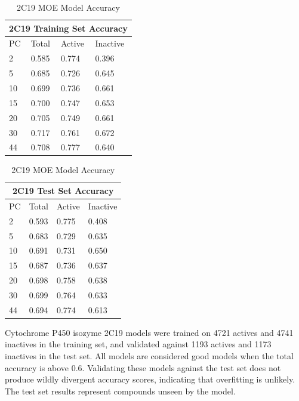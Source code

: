 \begin{table}[!htbp]
\begin{minipage}{.5\linewidth}
\centering
\begin{tabular}{|l|l|l|l|}
\hline
\multicolumn{4}{|c|}{2C19 Training Set Accuracy} \\ \hline
PC & Total          & Active          & Inactive \\ \hline
2  & 0.585          & 0.774           & 0.396   \\ \hline
5  & 0.685          & 0.726           & 0.645   \\ \hline
10 & 0.699          & 0.736           & 0.661    \\ \hline
15 & 0.700          & 0.747           & 0.653    \\ \hline
20 & 0.705          & 0.749           & 0.661    \\ \hline
30 & 0.717          & 0.761           & 0.672    \\ \hline
44 & 0.708          & 0.777           & 0.640    \\ \hline
\end{tabular}
\end{minipage}%
\begin{minipage}{.5\linewidth}
\centering
\begin{tabular}{|l|l|l|l|}
\hline
\multicolumn{4}{|c|}{2C19 Test Set Accuracy}       \\ \hline
PC & Total          & Active          & Inactive   \\ \hline
2  & 0.593          & 0.775           & 0.408      \\ \hline
5  & 0.683          & 0.729           & 0.635      \\ \hline
10 & 0.691          & 0.731           & 0.650      \\ \hline
15 & 0.687          & 0.736           & 0.637      \\ \hline
20 & 0.698          & 0.758           & 0.638      \\ \hline
30 & 0.699          & 0.764           & 0.633      \\ \hline
44 & 0.694          & 0.774           & 0.613      \\ \hline
\end{tabular}
\end{minipage}
\caption{2C19 MOE Model Accuracy}
\end{table}

Cytochrome P450 isozyme 2C19 models were trained on 4721 actives and 4741 inactives in the training set, and validated against 1193 actives and 1173 inactives in the test set. All models are considered good models when the  total accuracy is above 0.6. Validating these models against the test set does not produce wildly divergent accuracy scores, indicating that overfitting is unlikely. The test set results represent compounds unseen by the model. 



